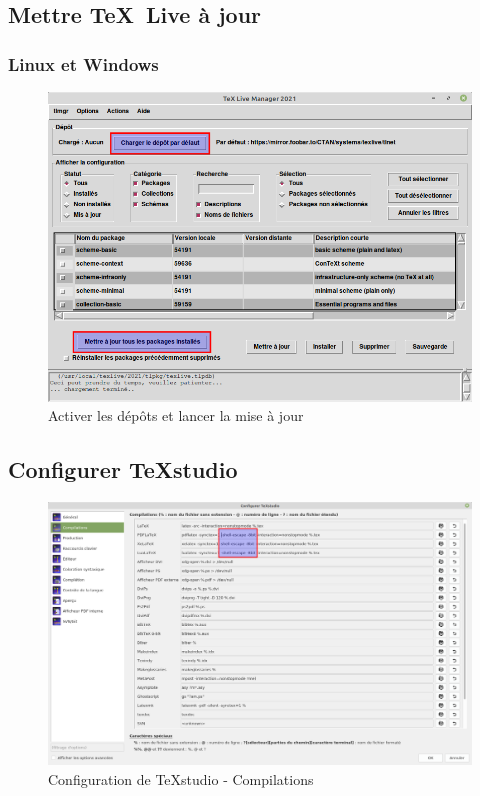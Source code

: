 \subsection{Mettre \TeX \ Live à jour}
\label{sec:majTl}


\subsubsection{Linux et Windows}

\begin{figure}[H]
	\centering
	\includegraphics[width=\linewidth]{captures/TL_manager_2021.png}
	\caption{Activer les dépôts et lancer la mise à jour}
	\label{fig:captureTLInstall01}
\end{figure}


\subsection{Configurer TeXstudio}
\label{sec:configTeXstudio}

\begin{figure}[H]
	\centering
	\includegraphics[width=\linewidth]{captures/configurer_TeXstudio_compilations}
	\caption{Configuration de TeXstudio - Compilations}
	\label{fig:captureConfigTeXstudioCompilations}
\end{figure}

